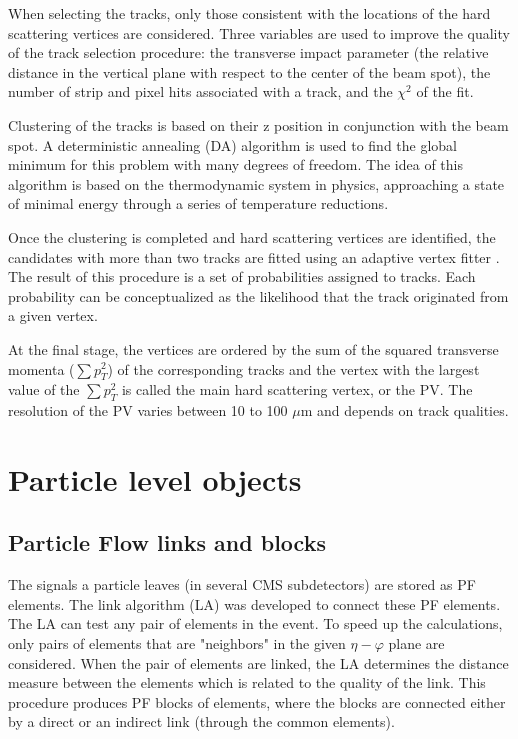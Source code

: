 When selecting the tracks, only those consistent with the locations of the hard scattering vertices are considered. Three variables are used to improve the quality of the track selection procedure: the transverse impact parameter (the relative distance in the vertical plane with respect to the center of the beam spot), the number of strip and pixel hits associated with a track, and the $\chi^2$ of the fit.

Clustering of the tracks is based on their z position in conjunction with the beam spot. A deterministic annealing (DA) algorithm \cite{DeterministicAnnealing} is used to find the global minimum for this problem with many degrees of freedom. The idea of this algorithm is based on the thermodynamic system in physics, approaching a state of minimal energy through a series of temperature reductions. 

Once the clustering is completed and hard scattering vertices are identified, the candidates with more than two tracks are fitted using an adaptive vertex fitter \cite{AdaptiveVertexFitting}. The result of this procedure is a set of probabilities assigned to tracks. Each probability can be conceptualized as the likelihood that the track originated from a given vertex.

At the final stage, the vertices are ordered by the sum of the squared transverse momenta ($\sum p_T^2$) of the corresponding tracks and the vertex with the largest value of the $\sum p_T^2$ is called the main hard scattering vertex, or the PV. The resolution of the PV varies between 10 to 100 $\mu$m and depends on track qualities. 

\section{Particle level objects}\label{sec:pf_objects}
\subsection{Particle Flow links and blocks}\label{sec:some_reconstruction}

The signals a particle leaves (in several CMS subdetectors) are stored as PF \cite{ParticleFlow} elements. The link algorithm (LA) was developed to connect these PF elements. The LA can test any pair of elements in the event. To speed up the calculations, only pairs of elements that are "neighbors" in the given $\eta - \varphi$ plane are considered. When the pair of elements are linked, the LA determines the distance measure between the elements which is related to the quality of the link. This procedure produces PF blocks of elements, where the blocks are connected either by a direct or an indirect link (through the common elements).

